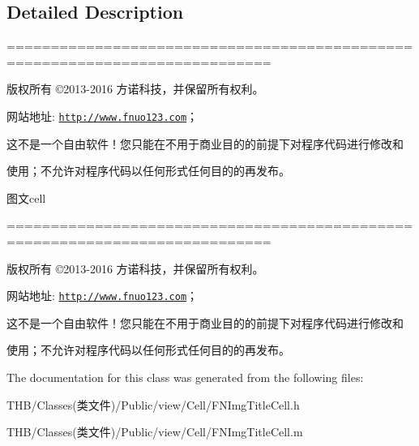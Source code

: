 \subsection{Detailed Description}
============================================================================

版权所有 ©2013-\/2016 方诺科技，并保留所有权利。

网站地址\+: \href{http://www.fnuo123.com}{\tt http\+://www.\+fnuo123.\+com}； 



这不是一个自由软件！您只能在不用于商业目的的前提下对程序代码进行修改和

使用；不允许对程序代码以任何形式任何目的的再发布。 



图文cell

============================================================================

版权所有 ©2013-\/2016 方诺科技，并保留所有权利。

网站地址\+: \href{http://www.fnuo123.com}{\tt http\+://www.\+fnuo123.\+com}； 



这不是一个自由软件！您只能在不用于商业目的的前提下对程序代码进行修改和

使用；不允许对程序代码以任何形式任何目的的再发布。 

 

The documentation for this class was generated from the following files\+:\begin{DoxyCompactItemize}
\item 
T\+H\+B/\+Classes(类文件)/\+Public/view/\+Cell/F\+N\+Img\+Title\+Cell.\+h\item 
T\+H\+B/\+Classes(类文件)/\+Public/view/\+Cell/F\+N\+Img\+Title\+Cell.\+m\end{DoxyCompactItemize}
